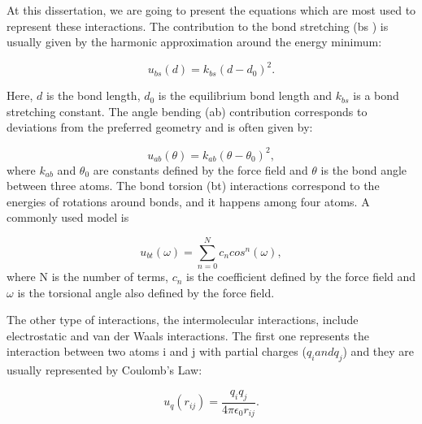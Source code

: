 At this dissertation, we are going to present the equations which are most used to represent these interactions. The contribution to the bond stretching (bs ) is usually given by the harmonic approximation around the energy minimum:

\begin{equation}
u_{bs}(d) = k_{bs} (d - d_{0})^2 .
\end{equation}

Here, $d$ is the bond length, $d_{0}$ is the equilibrium bond length and $k_{bs}$ is a bond stretching constant. The angle bending (ab) contribution corresponds to deviations from the preferred geometry and is often given by:

\begin{equation}
u_{ab}(\theta) = k_{ab} (\theta - \theta _{0})^2,
\end{equation}
where $k_{ab}$ and $\theta _{0}$ are constants defined by the force field and $\theta$ is the bond angle between three atoms.  The bond torsion (bt) interactions correspond to the energies of rotations around bonds, and it happens among four atoms. A commonly used model is

\begin{equation}
u_{bt}(\omega) = \sum_{n=0}^{N}  c_{n} cos^{n} (\omega) ,
\end{equation}
where N is the number of terms, $c_{n}$ is the coefficient defined by the force field and $\omega$ is the torsional angle also defined by the force field. 

The other type of interactions, the intermolecular interactions, include electrostatic and van der Waals interactions. The first one represents the interaction between two atoms i and j with partial charges ($q_{i} and q_{j}$) and they are usually represented by Coulomb's Law:

\begin{equation}
u_{q}(r_{ij}) = \frac{q_{i}q_{j}}{4 \pi \epsilon _{0} r_{ij}} .
\end{equation} 

